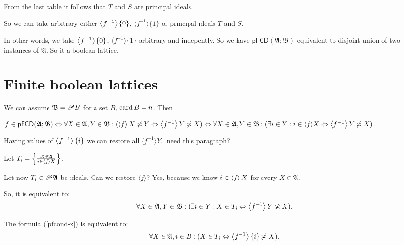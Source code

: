 From the last table it follows that $T$ and $S$ are principal ideals.

So we can take arbitrary either $\left\langle f^{- 1}\right\rangle \{ 0 \}$, $\langle
f^{- 1} \rangle \{ 1 \}$ or principal ideals $T$ and $S$.

In other words, we take $\left\langle f^{- 1}\right\rangle \{ 0 \}$, $\langle f^{- 1}
\rangle \{ 1 \}$ arbitrary and indepently. So we have $\mathsf{pFCD}
(\mathfrak{A}; \mathfrak{B})$ equivalent to disjoint union of two instances of
$\mathfrak{A}$. So it a boolean lattice.

\section{Finite boolean lattices}

We can assume $\mathfrak{B}= \mathscr{P} B$ for a set $B$, $\operatorname{card} B =
n$. Then

$f \in \mathsf{pFCD} (\mathfrak{A}; \mathfrak{B}) \Leftrightarrow \forall X \in
\mathfrak{A}, Y \in \mathfrak{B}: (\left\langle f\right\rangle X \not\asymp Y
\Leftrightarrow \left\langle f^{- 1}\right\rangle Y \not\asymp X) \Leftrightarrow \forall X
\in \mathfrak{A}, Y \in \mathfrak{B}: (\exists i \in Y : i \in \langle f
\rangle X \Leftrightarrow \left\langle f^{- 1}\right\rangle Y \not\asymp X)$.

Having values of $\left\langle f^{- 1}\right\rangle \{ i \}$ we can restore all $\langle
f^{- 1} \rangle Y$. [need this paragraph?]

Let $T_i = \left\{ \frac{ X \in \mathfrak{A} }{ i \in
\left\langle f\right\rangle X }\right\}$.

Let now $T_i \in \mathscr{P} \mathfrak{A}$ be ideals. Can we restore $\langle
f \rangle$? Yes, because we know $i \in \left\langle f\right\rangle X$ for every $X \in
\mathfrak{A}$.

So, it is equivalent to:
\begin{equation}
  \label{pfcond-x} \forall X \in \mathfrak{A}, Y \in \mathfrak{B}: (\exists i
  \in Y : X \in T_i \Leftrightarrow \left\langle f^{- 1}\right\rangle Y \not\asymp X) .
\end{equation}
\begin{lem}
  The formula (\ref{pfcond-x}) is equivalent to:
  \begin{equation}
    \label{pfcond-i} \forall X \in \mathfrak{A}, i \in B : (X \in T_i
    \Leftrightarrow \left\langle f^{- 1}\right\rangle \{ i \} \not\asymp X) .
  \end{equation}
\end{lem}

